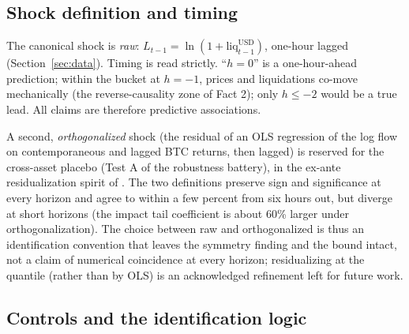 \subsection{Shock definition and timing}
\label{sec:method-shock}

The canonical shock is \emph{raw}: $L_{t-1} = \ln(1 +
\text{liq}^{\text{USD}}_{t-1})$, one-hour lagged
(Section~\ref{sec:data}). Timing is read strictly. ``$h=0$'' is a
one-hour-ahead prediction; within the bucket at $h=-1$, prices and
liquidations co-move mechanically (the reverse-causality zone of Fact 2);
only $h \le -2$ would be a true lead. All claims are therefore
predictive associations.

A second, \emph{orthogonalized} shock (the residual of an OLS regression
of the log flow on contemporaneous and lagged BTC returns, then lagged)
is reserved for the cross-asset placebo (Test A of the robustness battery),
in the ex-ante residualization spirit of \citet{borusyak2022}. The two
definitions preserve sign and significance at every horizon and agree to
within a few percent from six hours out, but diverge at short horizons (the
impact tail coefficient is about 60\% larger under orthogonalization). The
choice between raw and orthogonalized is thus an identification convention
that leaves the symmetry finding and the bound intact, not a claim of
numerical coincidence at every horizon; residualizing at the quantile (rather than by OLS)
is an acknowledged refinement left for future work.

\subsection{Controls and the identification logic}
\label{sec:method-controls}

